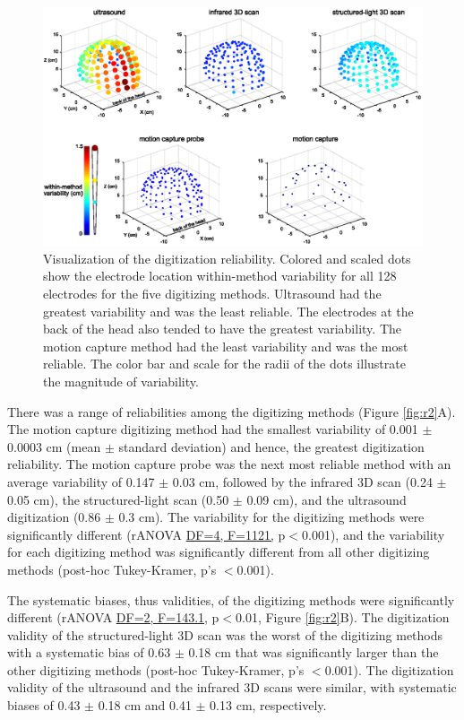 \documentclass[../thesis_seyed.tex]{subfiles}
\begin{document}
\begin{figure}[H]
    \centering
    \includegraphics[width=\linewidth]{../img/result1.eps}
    \caption{Visualization of the digitization reliability. Colored and scaled dots show the electrode location within-method variability for all 128 electrodes for the five digitizing methods. Ultrasound had the greatest variability and was the least reliable. The electrodes at the back of the head also tended to have the greatest variability. The motion capture method had the least variability and was the most reliable. The color bar and scale for the radii of the dots illustrate the magnitude of variability.}
    \label{fig:r1}
\end{figure}

There was a range of reliabilities among the digitizing methods (Figure \ref{fig:r2}A). The motion capture digitizing method had the smallest variability of 0.001 $\pm$ 0.0003 cm (mean $\pm$ standard deviation) and hence, the greatest digitization reliability. The motion capture probe was the next most reliable method with an average variability of 0.147 $\pm$ 0.03 cm, followed by the infrared 3D scan (0.24 $\pm$ 0.05 cm), the structured-light scan (0.50 $\pm$ 0.09 cm), and the ultrasound digitization (0.86 $\pm$ 0.3 cm). The variability for the digitizing methods were significantly different (rANOVA \ul{DF=4, F=1121,} p$<$0.001), and the variability for each digitizing method was significantly different from all other digitizing methods (post-hoc Tukey-Kramer, p's $<$0.001). 

The systematic biases, thus validities, of the digitizing methods were significantly different (rANOVA \ul{DF=2, F=143.1,} p$<$0.01, Figure \ref{fig:r2}B). The digitization validity of the structured-light 3D scan was the worst of the digitizing methods with a systematic bias of 0.63 $\pm$ 0.18 cm that was significantly larger than the other digitizing methods (post-hoc Tukey-Kramer, p's $<$0.001). The digitization validity of the ultrasound and the infrared 3D scans were similar, with systematic biases of 0.43 $\pm$ 0.18 cm and 0.41 $\pm$ 0.13 cm, respectively.
\end{document}
